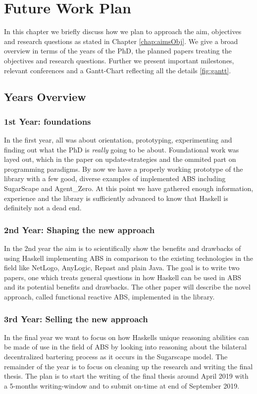 \chapter{Future Work Plan}
\label{chap:future}

In this chapter we briefly discuss how we plan to approach the aim, objectives and research questions as stated in Chapter \ref{chap:aimsObj}. We give a broad overview in terms of the years of the PhD, the planned papers treating the objectives and research questions. Further we present important milestones, relevant conferences and a Gantt-Chart reflecting all the details \ref{fig:gantt}.


\section{Years Overview}

\subsection{1st Year: foundations}
In the first year, all was about orientation, prototyping, experimenting and finding out what the PhD is \textit{really} going to be about. Foundational work was layed out, which in the paper on update-strategies and the ommited part on programming paradigms. By now we have a properly working prototype of the library with a few good, diverse examples of implemented ABS including SugarScape and Agent\_Zero. At this point we have gathered enough information, experience and the library is sufficiently advanced to know that Haskell is definitely not a dead end.

\subsection{2nd Year: Shaping the new approach}
In the 2nd year the aim is to scientifically show the benefits and drawbacks of using Haskell implementing ABS in comparison to the existing technologies in the field like NetLogo, AnyLogic, Repast and plain Java. The goal is to write two papers, one which treats general questions in how Haskell can be used in ABS and its potential benefits and drawbacks. The other paper will describe the novel approach, called functional reactive ABS, implemented in the library. 

\subsection{3rd Year: Selling the new approach}
In the final year we want to focus on how Haskells unique reasoning abilities can be made of use in the field of ABS by looking into reasoning about the bilateral decentralized bartering process as it occurs in the Sugarscape model.
The remainder of the year is to focus on cleaning up the research and writing the final thesis. The plan is to start the writing of the final thesis around April 2019 with a 5-months writing-window and to submit on-time at end of September 2019.

